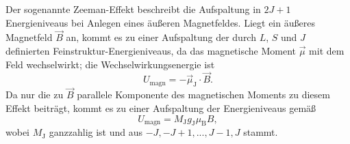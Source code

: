 Der sogenannte Zeeman-Effekt beschreibt die Aufspaltung in $2J+1$ Energieniveaus bei Anlegen eines äußeren
Magnetfeldes. Liegt ein äußeres Magnetfeld $\vec{B}$ an, kommt es zu einer Aufspaltung der durch $L$, $S$ und
$J$ definierten Feinstruktur-Energieniveaus, da das magnetische Moment $\vec{\mu}$ mit dem Feld wechselwirkt; die
Wechselwirkungsenergie ist
\begin{equation}
  U_\text{magn} = -\vec{\mu}_\text{J}\cdot\vec{B}.
\end{equation}
Da nur die zu $\vec{B}$ parallele Komponente des magnetischen Moments zu diesem Effekt beiträgt, kommt es zu einer Aufspaltung
der Energieniveaus gemäß
\begin{equation}
  U_\text{magn} = M_\text{J}g_\text{J}\mu_\text{B}B,
\end{equation}
wobei $M_\text{J}$ ganzzahlig ist und aus $-J, -J+1, ..., J-1, J$ stammt.

